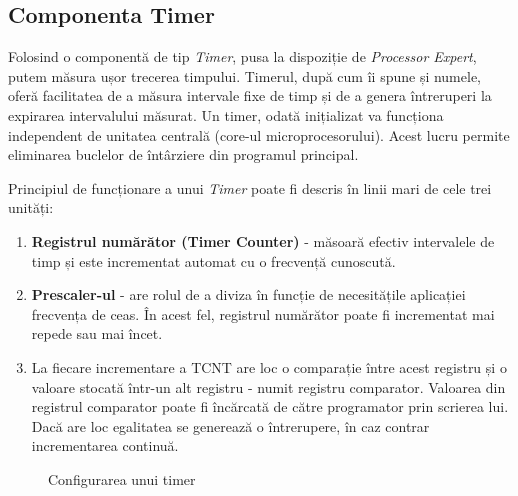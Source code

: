 \subsection{Componenta Timer}

Folosind o componentă de tip \textit{Timer}, pusa la dispoziție de \textit{Processor Expert}, putem măsura ușor trecerea timpului. Timerul, după cum îi spune și numele, oferă facilitatea de a măsura intervale fixe de timp și de a genera întreruperi la expirarea intervalului măsurat. Un timer, odată inițializat va funcționa independent de unitatea centrală (core-ul microprocesorului). Acest lucru permite eliminarea buclelor de întârziere din programul principal.

Principiul de funcționare a unui \textit{Timer} poate fi descris în linii mari de cele trei unități:

\begin{enumerate}
    \item \textbf{Registrul numărător (Timer Counter)} - măsoară efectiv intervalele de timp și este incrementat automat cu o frecvență cunoscută.
    \item \textbf{Prescaler-ul} - are rolul de a diviza în funcție de necesitățile aplicației frecvența de ceas. În acest fel, registrul numărător poate fi incrementat mai repede sau mai încet.
    \item La fiecare incrementare a TCNT are loc o comparație între acest registru și o valoare stocată într-un alt registru - numit registru comparator. Valoarea din registrul comparator poate fi încărcată de către programator prin scrierea lui. Dacă are loc egalitatea se generează o întrerupere, în caz contrar incrementarea continuă.
\end{enumerate}

\begin{figure}
    \vspace{-30pt}
    \vspace{-20pt}
    \caption{\label{fig:CodeWarrior-Timer} Configurarea unui timer}
    \vspace{-10pt}
\end{figure}

